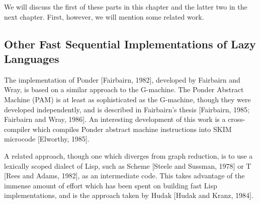 
\noindent
We will discuss the first of these parts in this chapter and the latter two in the
next chapter. First, however, we will mention some related work.

\subsection{Other Fast Sequential Implementations of Lazy Languages}

The implementation of Ponder [Fairbairn, 1982], developed by Fairbairn and
Wray, is based on a similar approach to the G-machine. The Ponder Abstract
Machine (PAM) is at least as sophisticated as the G-machine, though they
were developed independently, and is described in Fairbairn's thesis
[Fairbairn, 1985; Fairbairn and Wray, 1986]. An interesting development of
this work is a cross-compiler which compiles Ponder abstract machine
instructions into SKIM microcode [Elworthy, 1985].

A related approach, though one which diverges from graph reduction, is to
use a lexically scoped dialect of Lisp, such as Scheme [Steele and Sussman,
1978] or T [Rees and Adams, 1982], as an intermediate code. This takes
advantage of the immense amount of effort which has been spent on building
fast Lisp implementations, and is the approach taken by Hudak [Hudak and
Kranz, 1984].

